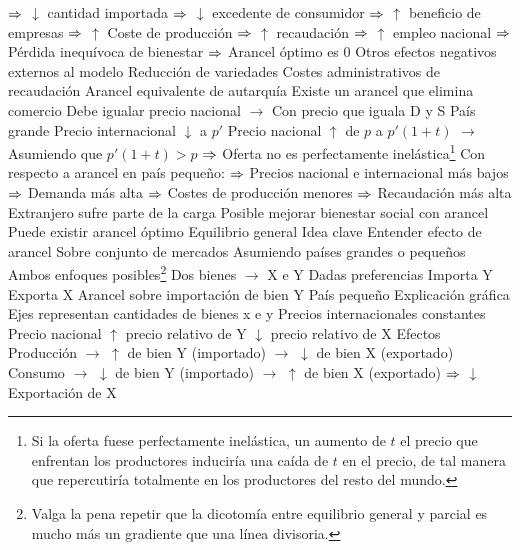 \documentclass{nuevotema}
\begin{document}
\begin{esquemal}
				\4[] $\then$ $\downarrow$ cantidad importada
				\4[] $\then$ $\downarrow$ excedente de consumidor
				\4[] $\then$ $\uparrow$ beneficio de empresas
				\4[] $\then$ $\uparrow$ Coste de producción
				\4[] $\then$ $\uparrow$ recaudación
				\4[] $\then$ $\uparrow$ empleo nacional
				\4[] $\then$ Pérdida inequívoca de bienestar
				\4[] $\then$ Arancel óptimo es 0
				\4[] 
				\4 Otros efectos negativos externos al modelo
				\4[] Reducción de variedades
				\4[] Costes administrativos de recaudación
				\4 Arancel equivalente de autarquía
				\4[] Existe un arancel que elimina comercio
				\4[] Debe igualar precio nacional
				\4[] $\to$ Con precio que iguala D y S
			\3 País grande
				\4 Precio internacional $\downarrow$ a $p'$
				\4 Precio nacional $\uparrow$ de $p$ a $p'(1+t)$
				\4[] $\to$ Asumiendo que $p'(1+t) > p$
				\4[] $\then$ Oferta no es perfectamente inelástica\footnote{Si la oferta fuese perfectamente inelástica, un aumento de $t$ el precio que enfrentan los productores induciría una caída de $t$ en el precio, de tal manera que repercutiría totalmente en los productores del resto del mundo.}
				\4 Con respecto a arancel en país pequeño:
				\4[] $\then$ Precios nacional e internacional más bajos
				\4[] $\then$ Demanda más alta
				\4[] $\then$ Costes de producción menores
				\4[] $\then$ Recaudación más alta
				\4[] 
				\4[$\then$] Extranjero sufre parte de la carga
				\4[$\then$] Posible mejorar bienestar social con arancel
				\4[$\then$] Puede existir arancel óptimo
		\2 Equilibrio general
			\3 Idea clave
				\4 Entender efecto de arancel
				\4[] Sobre conjunto de mercados
				\4 Asumiendo países grandes o pequeños
				\4[] Ambos enfoques posibles\footnote{Valga la pena repetir que la dicotomía entre equilibrio general y parcial es mucho más un gradiente que una línea divisoria.}
				\4 Dos bienes
				\4[] $\to$ X e Y
				\4 Dadas preferencias
				\4[] Importa Y
				\4[] Exporta X
				\4[$\to$] Arancel sobre importación de bien Y
			\3 País pequeño
				\4 Explicación gráfica
				\4[] Ejes representan cantidades de bienes x e y
				\4[] 
				\4 Precios internacionales constantes
				\4 Precio nacional
				\4[] $\uparrow$ precio relativo de Y
				\4[] $\downarrow$ precio relativo de X
				\4 Efectos
				\4[] Producción
				\4[] $\to$ $\uparrow$ de bien Y (importado)
				\4[] $\to$ $\downarrow$ de bien X (exportado)
				\4[] Consumo
				\4[] $\to$ $\downarrow$ de bien Y (importado)
				\4[] $\to$ $\uparrow$ de bien X (exportado)
				\4[] $\then$ $\downarrow$ Exportación de X

\end{esquemal}
\end{document}
